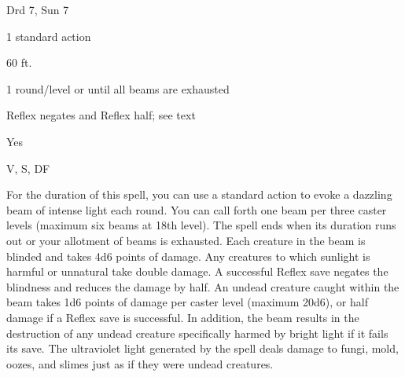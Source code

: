 
\begin{description*}
\item[Level:] Drd 7, Sun 7
\item[Casting Time:] 1 standard action
\item[Range:] 60 ft.
\item[Duration:] 1 round/level or until all beams are exhausted
\item[Saving Throw:] Reflex negates and Reflex half; see text
\item[Spell Resistance:] Yes
\item[Components:] V, S, DF
\end{description*}

For the duration of this spell, you can use a standard action to evoke a dazzling
beam of intense light each round. You can call forth one beam per three caster
levels (maximum six beams at 18th level). The spell ends when its duration runs
out or your allotment of beams is exhausted.
Each creature in the beam is blinded and takes 4d6 points of damage. Any creatures
to which sunlight is harmful or unnatural take double damage. A successful Reflex
save negates the blindness and reduces the damage by half.
An undead creature caught within the beam takes 1d6 points of damage per caster
level (maximum 20d6), or half damage if a Reflex save is successful. In addition,
the beam results in the destruction of any undead creature specifically harmed
by bright light if it fails its save.
The ultraviolet light generated by the spell deals damage to fungi, mold, oozes,
and slimes just as if they were undead creatures.